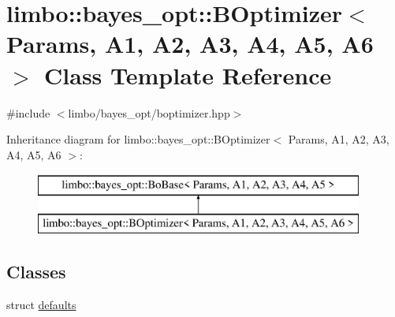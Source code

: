 \hypertarget{classlimbo_1_1bayes__opt_1_1_b_optimizer}{}\section{limbo\+:\+:bayes\+\_\+opt\+:\+:B\+Optimizer$<$ Params, A1, A2, A3, A4, A5, A6 $>$ Class Template Reference}
\label{classlimbo_1_1bayes__opt_1_1_b_optimizer}


{\ttfamily \#include $<$limbo/bayes\+\_\+opt/boptimizer.\+hpp$>$}

Inheritance diagram for limbo\+:\+:bayes\+\_\+opt\+:\+:B\+Optimizer$<$ Params, A1, A2, A3, A4, A5, A6 $>$\+:\begin{figure}[H]
\begin{center}
\leavevmode
\includegraphics[height=2.000000cm]{classlimbo_1_1bayes__opt_1_1_b_optimizer}
\end{center}
\end{figure}
\subsection*{Classes}
\begin{DoxyCompactItemize}
\item 
struct \hyperlink{structlimbo_1_1bayes__opt_1_1_b_optimizer_1_1defaults}{defaults}
\end{DoxyCompactItemize}
